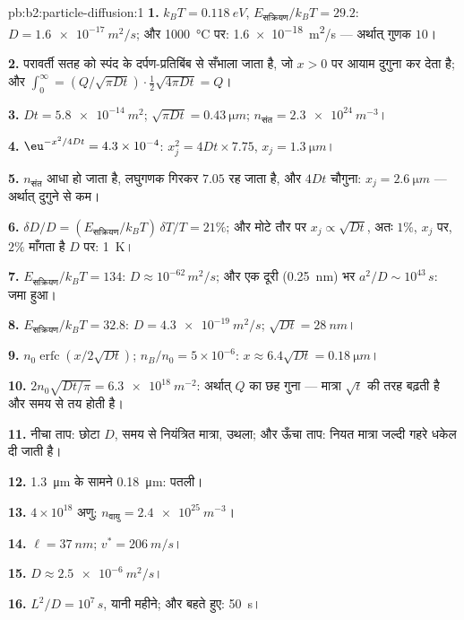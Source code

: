 \begin{solution}{pb:b2:particle-diffusion:1}
\textbf{1.} $k_BT = \qty{0.118}{eV}$, $E_{\text{सक्रियण}}/k_BT = 29.2$: $D =
\qty{1.6e-17}{m^2/s}$; और \qty{1000}{\celsius} पर: \qty{1.6e-18}{m^2/s} --- अर्थात्
गुणक $10$।

\textbf{2.} परावर्ती सतह को स्पंद के दर्पण-प्रतिबिंब से सँभाला जाता है,
जो $x > 0$ पर आयाम दुगुना कर देता है; और $\int_0^\infty = (Q/\sqrt{\pi Dt})
\cdot \tfrac12\sqrt{4\pi Dt} = Q$।

\textbf{3.} $Dt = \qty{5.8e-14}{m^2}$; $\sqrt{\pi Dt} = \qty{0.43}{\micro m}$; $n_{\text{संत}}
= \qty{2.3e24}{m^{-3}}$।

\textbf{4.} $\eu^{-x^2/4Dt} = 4.3 \times 10^{-4}$: $x_j^2 = 4Dt \times 7.75$, $x_j =
\qty{1.3}{\micro m}$।

\textbf{5.} $n_{\text{संत}}$ आधा हो जाता है, लघुगणक गिरकर $7.05$ रह जाता है, और $4Dt$
चौगुना: $x_j = \qty{2.6}{\micro m}$ --- अर्थात् दुगुने से कम।

\textbf{6.} $\delta D/D = (E_{\text{सक्रियण}}/k_BT)\,\delta T/T = 21\%$; और मोटे तौर पर $x_j \propto
\sqrt{Dt}$, अतः $1\%$, $x_j$ पर, $2\%$ माँगता है $D$ पर: \qty{1}{K}।

\textbf{7.} $E_{\text{सक्रियण}}/k_BT = 134$: $D \approx 10^{-62}\,\unit{m^2/s}$; और एक
दूरी (\qty{0.25}{nm}) भर $a^2/D \sim 10^{43}\,\unit{s}$: जमा हुआ।

\textbf{8.} $E_{\text{सक्रियण}}/k_BT = 32.8$: $D = \qty{4.3e-19}{m^2/s}$; $\sqrt{Dt} =
\qty{28}{nm}$।

\textbf{9.} $n_0\operatorname{erfc}(x/2\sqrt{Dt})$; $n_B/n_0 = 5 \times 10^{-6}$:
$x \approx 6.4\sqrt{Dt} = \qty{0.18}{\micro m}$।

\textbf{10.} $2n_0\sqrt{Dt/\pi} = \qty{6.3e18}{m^{-2}}$: अर्थात् $Q$ का छह गुना ---
मात्रा $\sqrt t$ की तरह बढ़ती है और समय से तय होती है।

\textbf{11.} नीचा ताप: छोटा $D$, समय से नियंत्रित मात्रा,
उथला; और ऊँचा ताप: नियत मात्रा जल्दी गहरे धकेल दी जाती है।

\textbf{12.} \qty{1.3}{\micro m} के सामने \qty{0.18}{\micro m}: पतली।

\textbf{13.} $4 \times 10^{18}$ अणु; $n_{\text{वायु}} = \qty{2.4e25}{m^{-3}}$।

\textbf{14.} $\ell = \qty{37}{nm}$; $v^* = \qty{206}{m/s}$।

\textbf{15.} $D \approx \qty{2.5e-6}{m^2/s}$।

\textbf{16.} $L^2/D = 10^7\,\unit{s}$, यानी महीने; और बहते हुए: \qty{50}{s}।


\end{solution}
